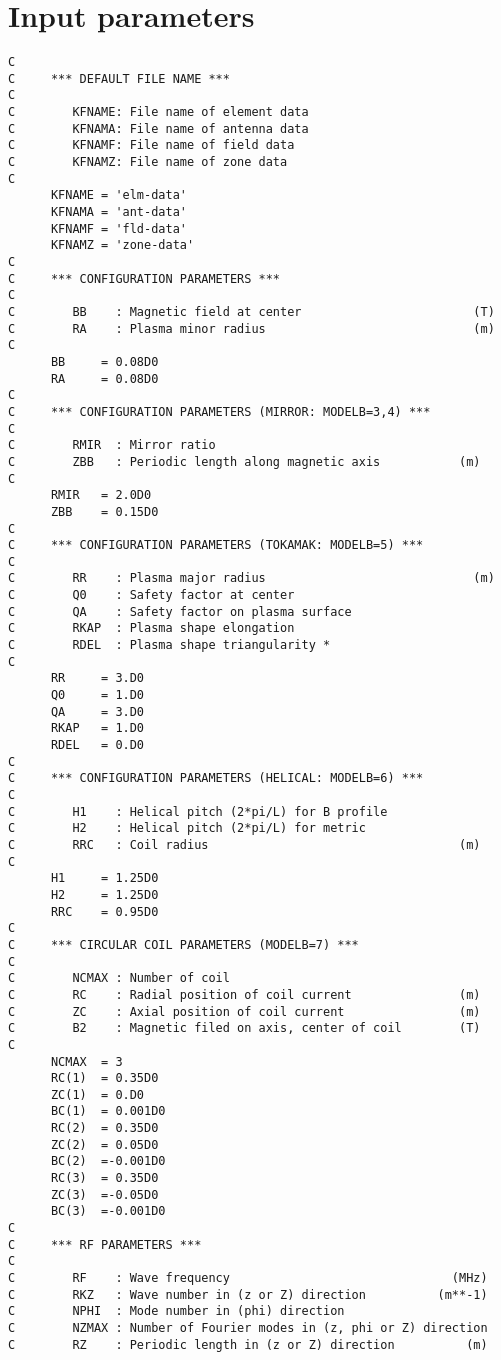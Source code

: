 \section{Input parameters}


{
\def\baselinestretch{0.7}
\begin{verbatim}
C
C     *** DEFAULT FILE NAME ***
C
C        KFNAME: File name of element data
C        KFNAMA: File name of antenna data
C        KFNAMF: File name of field data
C        KFNAMZ: File name of zone data
C
      KFNAME = 'elm-data'
      KFNAMA = 'ant-data'
      KFNAMF = 'fld-data'
      KFNAMZ = 'zone-data'
C
C     *** CONFIGURATION PARAMETERS ***
C
C        BB    : Magnetic field at center                        (T)
C        RA    : Plasma minor radius                             (m)
C
      BB     = 0.08D0
      RA     = 0.08D0
C
C     *** CONFIGURATION PARAMETERS (MIRROR: MODELB=3,4) ***
C
C        RMIR  : Mirror ratio
C        ZBB   : Periodic length along magnetic axis           (m)
C
      RMIR   = 2.0D0
      ZBB    = 0.15D0
C
C     *** CONFIGURATION PARAMETERS (TOKAMAK: MODELB=5) ***
C
C        RR    : Plasma major radius                             (m)
C        Q0    : Safety factor at center
C        QA    : Safety factor on plasma surface
C        RKAP  : Plasma shape elongation
C        RDEL  : Plasma shape triangularity *
C
      RR     = 3.D0
      Q0     = 1.D0
      QA     = 3.D0
      RKAP   = 1.D0
      RDEL   = 0.D0
C
C     *** CONFIGURATION PARAMETERS (HELICAL: MODELB=6) ***
C
C        H1    : Helical pitch (2*pi/L) for B profile
C        H2    : Helical pitch (2*pi/L) for metric
C        RRC   : Coil radius                                   (m)
C
      H1     = 1.25D0
      H2     = 1.25D0
      RRC    = 0.95D0
C
C     *** CIRCULAR COIL PARAMETERS (MODELB=7) ***
C
C        NCMAX : Number of coil
C        RC    : Radial position of coil current               (m)
C        ZC    : Axial position of coil current                (m)
C        B2    : Magnetic filed on axis, center of coil        (T)
C
      NCMAX  = 3
      RC(1)  = 0.35D0
      ZC(1)  = 0.D0
      BC(1)  = 0.001D0
      RC(2)  = 0.35D0
      ZC(2)  = 0.05D0
      BC(2)  =-0.001D0
      RC(3)  = 0.35D0
      ZC(3)  =-0.05D0
      BC(3)  =-0.001D0
C
C     *** RF PARAMETERS ***
C
C        RF    : Wave frequency                               (MHz)
C        RKZ   : Wave number in (z or Z) direction          (m**-1)
C        NPHI  : Mode number in (phi) direction
C        NZMAX : Number of Fourier modes in (z, phi or Z) direction
C        RZ    : Periodic length in (z or Z) direction          (m)

\end{verbatim}}
